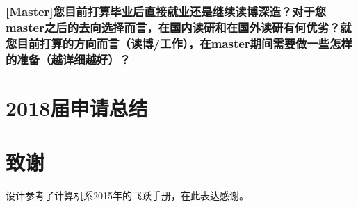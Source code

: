 \documentclass[a4paper,UTF8]{book}
\begin{document}
\subsection*{[Master]您目前打算毕业后直接就业还是继续读博深造？对于您master之后的去向选择而言，在国内读研和在国外读研有何优劣？就您目前打算的方向而言（读博/工作），在master期间需要做一些怎样的准备（越详细越好）？}



\chapter{2018届申请总结}

\chapter{致谢}
设计参考了计算机系2015年的飞跃手册，在此表达感谢。
\end{document}
